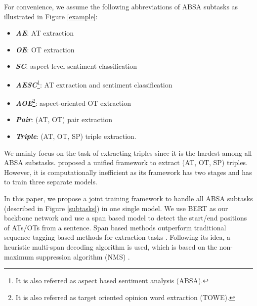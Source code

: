 \documentclass[letterpaper]{article} \usepackage{aaai21}  \usepackage{times}  \usepackage{helvet} \usepackage{courier}  \usepackage[hyphens]{url}  \usepackage{graphicx} \urlstyle{rm} \def\UrlFont{\rm}  \usepackage{natbib}  \usepackage{caption}
\begin{document}
For convenience, we assume the following abbreviations of ABSA subtasks as illustrated in Figure \ref{example}:  
 \begin{itemize}
    \item \textbf{\emph{AE}}: AT extraction
    \item \textbf{\emph{OE}}: OT extraction
    \item \textbf{\emph{SC}}: aspect-level sentiment classification
    \item \textbf{\emph{AESC}}\footnote{It is also referred as aspect based sentiment analysis (ABSA).}: AT extraction and sentiment classification
    \item \textbf{\emph{AOE}}\footnote{It is also referred as target oriented opinion word extraction (TOWE).}: aspect-oriented OT extraction
    \item \textbf{\emph{Pair}}: (AT, OT) pair extraction 
    \item \textbf{\emph{Triple}}: (AT, OT, SP) triple extraction.
\end{itemize} 




We mainly focus on the task of extracting  triples since it is the hardest among all ABSA substasks.   
\citet{peng2020knowing} proposed a unified framework to extract (AT, OT, SP) triples. 
However, it is computationally inefficient as its framework has two stages and has to train three separate models.


In this paper, we propose a joint training framework to handle all ABSA subtasks (described in Figure \ref{subtasks}) in one single model.
We use BERT \cite{devlin2019bert} as our backbone network and use a span based model to detect the start/end positions of ATs/OTs from a sentence.
Span based methods outperform traditional sequence tagging based methods for extraction tasks \cite{hu-etal-2019-open}.    
Following its idea, a heuristic multi-span decoding algorithm is used, which is based on the non-maximum suppression algorithm (NMS) \cite{Rosenfeld:1971:ECD}.
\end{document}
